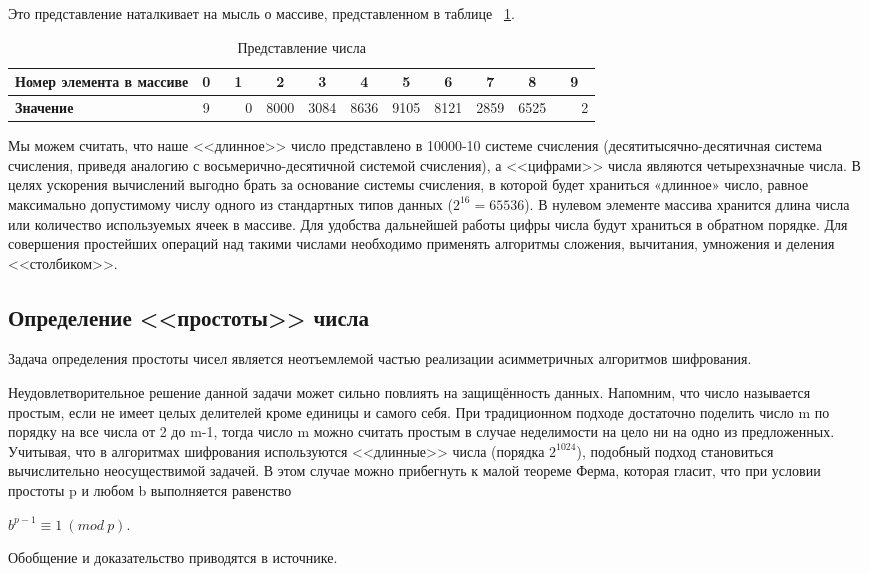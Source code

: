 Это представление наталкивает на мысль о массиве, представленном в таблице
~\ref{tab:2}.

\begin{table}[ht]
  \centering
  \small
  \begin{tabular}{|p{4cm}|*{10}{c|}}
    \hline
	\textbf{Номер элемента в массиве}  & 0 & 1 & 2 & 3 & 4 & 5 & 6 & 7 & 8 & 9 \\
	\hline 
	\textbf{Значение} & 9 & \ \ \ 0 & 8000 & 3084 & 8636 & 9105 & 8121 & 2859 &
	6525 & \ \ \ 2
	\\
	\hline
  \end{tabular}
  \caption{Представление числа}
  \label{tab:2}
\end{table}

Мы можем считать, что наше <<длинное>> число представлено в 10000-10 системе
счисления (десятитысячно-десятичная система счисления, приведя аналогию с
восьмерично-десятичной системой счисления), а <<цифрами>> числа являются
четырехзначные числа. В целях ускорения вычислений выгодно брать за основание
системы счисления, в которой будет храниться «длинное» число, равное максимально
допустимому числу одного из стандартных типов данных ($2^{16} = 65536$).
В нулевом элементе массива хранится длина числа или количество используемых
ячеек в массиве. Для удобства дальнейшей работы цифры числа будут храниться в
обратном порядке. Для совершения простейших операций над такими числами
необходимо применять алгоритмы сложения, вычитания, умножения и деления
<<столбиком>>.

\subsection{Определение <<простоты>> числа}
Задача определения простоты чисел является неотъемлемой частью реализации
асимметричных алгоритмов шифрования.

Неудовлетворительное решение данной задачи может сильно повлиять на защищённость
данных. Напомним, что число называется простым, если не имеет целых делителей
кроме единицы и самого себя.  При традиционном подходе достаточно поделить число
m по порядку на все числа от 2 до m-1, тогда число m можно считать простым в
случае неделимости на цело ни на одно из предложенных. Учитывая, что в
алгоритмах шифрования используются <<длинные>> числа (порядка $2^{1024}$),
подобный подход становиться вычислительно неосуществимой задачей.
В этом случае можно прибегнуть к малой теореме Ферма, которая гласит, что при
условии простоты p и любом b выполняется равенство 
\begin{center}
$b^{p-1} \equiv 1 \ (mod \ p)$.
\end{center}
Обобщение и доказательство приводятся в источнике.~\cite{ferma}

